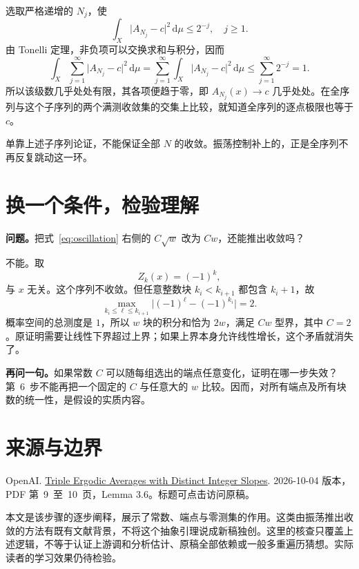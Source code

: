 \documentclass[12pt,a4paper]{article}
\newcommand{\dd}{\,\mathrm{d}}
\begin{document}
选取严格递增的 $N_j$，使
\[
\int_X\lvert A_{N_j}-c\rvert^2\dd\mu\leq2^{-j},
\quad j\geq1.
\]
由 Tonelli 定理，非负项可以交换求和与积分，因而
\[
\int_X\sum_{j=1}^{\infty}\lvert A_{N_j}-c\rvert^2\dd\mu
=\sum_{j=1}^{\infty}\int_X\lvert A_{N_j}-c\rvert^2\dd\mu
\leq\sum_{j=1}^{\infty}2^{-j}=1.
\]
所以该级数几乎处处有限，其各项便趋于零，即 $A_{N_j}(x)\to c$ 几乎处处。在全序列与这个子序列的两个满测收敛集的交集上比较，就知道全序列的逐点极限也等于 $c$。

单靠上述子序列论证，不能保证全部 $N$ 的收敛。振荡控制补上的，正是全序列不再反复跳动这一环。

\section{换一个条件，检验理解}
\noindent\textbf{问题。}把式~\eqref{eq:oscillation} 右侧的 $C\sqrt w$ 改为 $Cw$，还能推出收敛吗？

不能。取
\[
Z_k(x)=(-1)^k,
\]
与 $x$ 无关。这个序列不收敛。但任意整数块 $k_i<k_{i+1}$ 都包含 $k_i+1$，故
\[
\max_{k_i\leq\ell\leq k_{i+1}}\lvert(-1)^\ell-(-1)^{k_i}\rvert=2.
\]
概率空间的总测度是 $1$，所以 $w$ 块的积分和恰为 $2w$，满足 $Cw$ 型界，其中 $C=2$。原证明需要让线性下界超过上界；如果上界本身允许线性增长，这个矛盾就消失了。

\noindent\textbf{再问一句。}如果常数 $C$ 可以随每组选出的端点任意变化，证明在哪一步失效？第~6~步不能再把一个固定的 $C$ 与任意大的 $w$ 比较。因而，对所有端点及所有块数的统一性，是假设的实质内容。

\section{来源与边界}
\label{ref:source}
\noindent [1] OpenAI. \href{https://github.com/openai/math/blob/fd4aeeb2ee4fc729c18d98444fed42fd0529eeeb/preprints/Triple-ergodic-averages-with-distinct-integer-slopes-October-4-2026/triple-ergodic-distinct-slopes.pdf}{Triple Ergodic Averages with Distinct Integer Slopes}. 2026-10-04 版本，PDF 第~9~至~10~页，Lemma 3.6。标题可点击访问原稿。

本文是该步骤的逐步阐释，展示了常数、端点与零测集的作用。这类由振荡推出收敛的方法有既有文献背景，不将这个抽象引理说成新稿独创。这里的核查只覆盖上述逻辑，不等于认证上游调和分析估计、原稿全部依赖或一般多重遍历猜想。实际读者的学习效果仍待检验。
\end{document}
